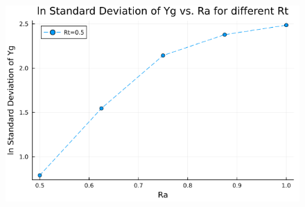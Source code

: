 

\begin{figure}[H]
  \centering
  \includegraphics[scale=0.5]{image/lnStdYg_Ra0.5to1.0_Rt0.5_ti25000.png}
  \caption{}
  \label{}
\end{figure}
